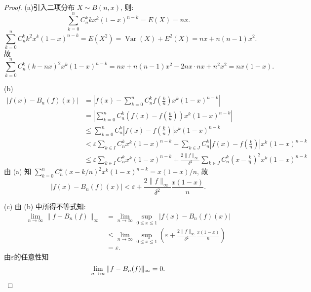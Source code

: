 \begin{proof}
(a)引入二项分布 $X\sim B(n,x)$, 则:
\[\sum_{k=0}^nC_n^kkx^k(1-x)^{n-k} = E(X) = nx.\]
\[\sum_{k=0}^nC_n^kk^2x^k(1-x)^{n-k}=E(X^2)=\operatorname{Var}(X)+E^2(X)=nx+n(n-1)x^2.\]
故
\[\sum_{k=0}^nC_n^k(k-nx)^2x^k(1-x)^{n-k}=nx+n(n-1)x^2-2nx\cdot nx+n^2x^2=nx(1-x).\]

(b)
\begin{align*}
  |f(x)-B_n(f)(x)|
  & = \left|f(x)-\sum_{k=0}^nC_n^kf\left(\frac{k}{n}\right)x^k(1-x)^{n-k}\right| \\
  & = \left|\sum_{k=0}^nC_n^k\left(f(x)-f\left(\frac{k}{n}\right)\right)x^k(1-x)^{n-k}\right| \\
  & \leq \sum_{k=0}^nC_n^k\left|f(x)-f\left(\frac{k}{n}\right)\right|x^k(1-x)^{n-k} \\
  & < \varepsilon\sum_{k\in I}C_n^kx^k(1-x)^{n-k}
      + \sum_{k\in J}C_n^k\left|f(x)-f\left(\frac{k}{n}\right)\right|x^k(1-x)^{n-k} \\
  & \leq \varepsilon\sum_{k\in I}C_n^kx^k(1-x)^{n-k}
      + \frac{2\|f\|_{\infty}}{\delta^2}
        \sum_{k\in J}C_n^k\left(x-\frac{k}{n}\right)^2x^k(1-x)^{n-k}
\end{align*}
由 (a) 知 $\sum_{k=0}^nC_n^k(x-k/n)^2x^k(1-x)^{n-k}=x(1-x)/n$, 故
\[|f(x)-B_n(f)(x)|<\varepsilon+\frac{2\|f\|_{\infty}}{\delta^2}\frac{x(1-x)}{n}.\]

(c) 由 (b) 中所得不等式知:
\[\begin{split}
  \lim_{n\to\infty}\|f-B_n(f)\|_{\infty}
  & =\lim_{n\to\infty}\sup\limits_{0\leq x\leq 1}|f(x)-B_n(f)(x)| \\
  & \leq \lim_{n\to\infty}\sup \limits_{0\leq x\leq 1}
    \left(\varepsilon+\frac{2\|f\|_{\infty}}{\delta^2}\frac{x(1-x)}{n}\right) \\
  & = \varepsilon.
\end{split}\]
由$\varepsilon$的任意性知
\[\lim_{n\to\infty}\|f-B_n(f)\|_{\infty}=0.\qedhere\]
\end{proof}


